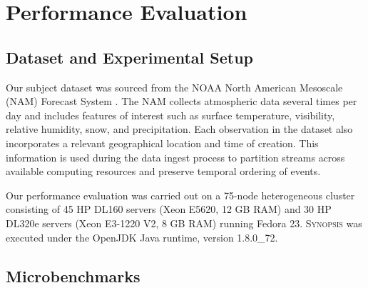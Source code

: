 \section{Performance Evaluation}
\label{sec:performance}

\subsection{Dataset and Experimental Setup}
Our subject dataset was sourced from the NOAA North American Mesoscale (NAM) Forecast System \cite{noaa_nam}.  The NAM collects atmospheric data several times per day and includes features of interest such as surface temperature, visibility, relative humidity, snow, and precipitation. Each observation in the dataset also incorporates a relevant geographical location and time of creation. This information is used during the data ingest process to partition streams across available computing resources and preserve temporal ordering of events.

Our performance evaluation was carried out on a 75-node heterogeneous cluster consisting of 45 HP DL160 servers (Xeon E5620, 12 GB RAM) and 30 HP DL320e servers (Xeon E3-1220 V2, 8 GB RAM) running Fedora 23. \textsc{Synopsis} was executed under the OpenJDK Java runtime, version 1.8.0\_72.

\subsection{Microbenchmarks}
